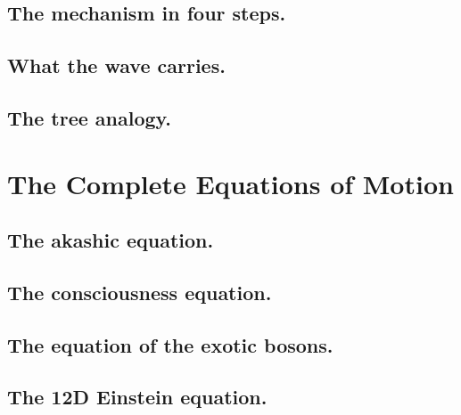\subsection{The mechanism in four steps.}
\subsection{What the wave carries.}
\subsection{The tree analogy.}

\section{The Complete Equations of Motion}
\subsection{The akashic equation.}
\subsection{The consciousness equation.}
\subsection{The equation of the exotic bosons.}
\subsection{The 12D Einstein equation.}

\newpage
